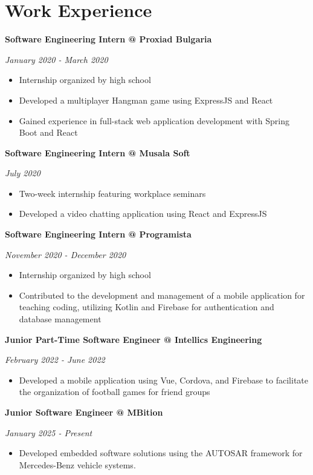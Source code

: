 \documentclass[a4paper,10pt]{article}
\begin{document}
\section*{Work Experience}

\textbf{Software Engineering Intern @ Proxiad Bulgaria}

\textit{January 2020 - March 2020}
\begin{itemize}
    \item Internship organized by high school
    \item Developed a multiplayer Hangman game using ExpressJS and React
    \item Gained experience in full-stack web application development with Spring Boot and React
\end{itemize}

\textbf{Software Engineering Intern @ Musala Soft}

\textit{July 2020}
\begin{itemize}
    \item Two-week internship featuring workplace seminars
    \item Developed a video chatting application using React and ExpressJS
\end{itemize}

\textbf{Software Engineering Intern @ Programista}

\textit{November 2020 - December 2020}
\begin{itemize}
    \item Internship organized by high school
    \item Contributed to the development and management of a mobile application for teaching coding, utilizing Kotlin and Firebase for authentication and database management
\end{itemize}

\textbf{Junior Part-Time Software Engineer @ Intellics Engineering}

\textit{February 2022 - June 2022}
\begin{itemize}
    \item Developed a mobile application using Vue, Cordova, and Firebase to facilitate the organization of football games for friend groups
\end{itemize}

\textbf{Junior Software Engineer @ MBition}

\textit{January 2025 - Present}
\begin{itemize}
    \item Developed embedded software solutions using the AUTOSAR framework for Mercedes-Benz vehicle systems.
\end{itemize}
\end{document}
